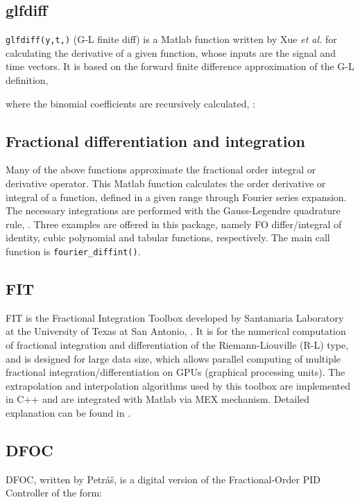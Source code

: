 \documentclass[11pt]{tCON2e}
\theoremstyle{plain}\newtheorem{theorem}{Theorem}
\theoremstyle{definition}
\theoremstyle{remark}
\begin{document}
\subsection{glfdiff}
{\tt glfdiff(y,t,)} (G-L finite diff) is a Matlab function written by Xue \emph{et al.} \cite{ref:Xuedingyu_book} for calculating the  derivative of a given function, whose inputs  are the signal and time vectors. It is based on the forward finite difference approximation of the G-L definition,

where the binomial coefficients are recursively calculated, \cite{ref:Xuedingyu_book}:





\subsection{Fractional differentiation and integration}
Many of the above functions approximate the fractional order integral or derivative operator. This Matlab function calculates the  order derivative or integral of a function, defined in a given range through Fourier series expansion. The necessary integrations are performed with the Gauss-Legendre quadrature rule, \cite{ref:FO_diff_and_int}. Three examples are offered in this package, namely FO differ/integral of identity, cubic polynomial and tabular functions, respectively. The main call function is {\tt fourier\_diffint()}.



\subsection{FIT}
FIT is the Fractional Integration Toolbox developed by Santamaria Laboratory at the University of Texas at San Antonio, \cite{ref:FIT_download}. It is for the numerical computation of fractional integration and differentiation of the Riemann-Liouville (R-L) type, and is designed for large data size, which allows parallel computing of multiple fractional integration/differentiation on GPUs (graphical processing units). The extrapolation and interpolation algorithms used by this toolbox are implemented in C++ and are integrated with Matlab via MEX mechanism. Detailed explanation can be found in \cite{ref:FIT}.



\subsection{DFOC}
DFOC, written by Petr\'{a}\v{s}, is a digital version of the Fractional-Order PID Controller of the form:
\end{document}

